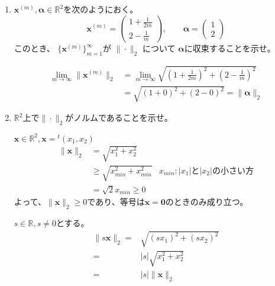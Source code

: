 \documentclass[10pt,b5paper]{ltjsarticle}
\begin{document}
\begin{enumerate}\renewcommand{\theenumi}{(\arabic{enumi})}
 \item
      $\bm{x}^{(m)}, \bm{\alpha} \in \mathbb{R}^2$を次のようにおく。
      \begin{equation}
       \bm{x}^{(m)}=
       \begin{pmatrix}
        1+\frac{1}{2m}\\
        2-\frac{1}{m}
       \end{pmatrix}
       , \qquad
       \bm{\alpha} =
       \begin{pmatrix}
        1\\
        2
       \end{pmatrix}
      \end{equation}
      このとき、
      $\{ \bm{x}^{(m)} \}_{m=1}^{\infty}$が
      $\|\cdot\|_{2}$ について
      $\bm{\alpha}$に収束することを示せ。

      \dotfill

      \begin{align}
       \lim_{m\rightarrow\infty} \| \bm{x}^{(m)} \|_2
       &= \lim_{m\rightarrow\infty} \sqrt{\left( 1+\frac{1}{2m} \right)^2
       + \left( 2-\frac{1}{m} \right)^2}\\
       &= \sqrt{\left( 1+0 \right)^2
       + \left( 2-0 \right)^2} = \|\bm{\alpha}\|_2
      \end{align}

      \hrulefill
 \item
      $\mathbb{R}^2$上で$\|\cdot\|_2$がノルムであることを示せ。

      \dotfill

      $\bm{x}\in\mathbb{R}^2, \bm{x}={}^{t}(x_1, x_2)$
      \begin{align}
       \| \bm{x} \|_2 &= \sqrt{x_1^2+x_2^2}\\
       & \geq \sqrt{x_{min}^2+x_{min}^2} & x_{min}: \lvert x_1 \rvert と \lvert x_2\rvert の小さい方\\
       & = \sqrt{2}x_{min} \geq 0
      \end{align}
      よって、$\|\bm{x}\|_2 \geq 0$であり、等号は$\bm{x}=\bm{0}$のときのみ成り立つ。

      $s \in \mathbb{R}, s \ne 0$とする。
      \begin{align}
       \| s\bm{x} \|_2 = & \sqrt{ (s x_1)^2+ (s x_2)^2 }\\
       = & \lvert s \rvert \sqrt{  x_1^2+  x_2^2 }\\
       = & \lvert s \rvert \|\bm{x}\|_2
      \end{align}


\end{enumerate}
\end{document}
